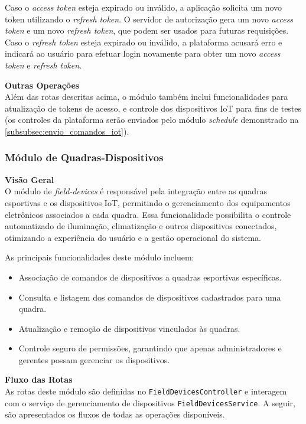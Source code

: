 Caso o \textit{access token} esteja expirado ou inválido, a aplicação solicita um novo token utilizando o \textit{refresh token}. O servidor de autorização gera um novo \textit{access token} e um novo \textit{refresh token}, que podem ser usados para futuras requisições. Caso o \textit{refresh token} esteja expirado ou inválido, a plataforma acusará erro e indicará ao usuário para efetuar login novamente para obter um novo \textit{access token} e \textit{refresh token}.
 
\textbf{Outras Operações}\\
Além das rotas descritas acima, o módulo também inclui funcionalidades para atualização de tokens de acesso, e controle dos dispositivos IoT para fins de testes (os controles da plataforma serão enviados pelo módulo \textit{schedule} demonstrado na \autoref{subsubsec:envio_comandos_iot}).

\subsubsection{Módulo de Quadras-Dispositivos}\label{subsubsec:modulo_quadras_dispositivos}

\textbf{Visão Geral}\\
O módulo de \textit{field-devices} é responsável pela integração entre as quadras esportivas e os dispositivos IoT, permitindo o gerenciamento dos equipamentos eletrônicos associados a cada quadra. Essa funcionalidade possibilita o controle automatizado de iluminação, climatização e outros dispositivos conectados, otimizando a experiência do usuário e a gestão operacional do sistema.

As principais funcionalidades deste módulo incluem:

\begin{itemize}
\item Associação de comandos de dispositivos a quadras esportivas específicas.
\item Consulta e listagem dos comandos de dispositivos cadastrados para uma quadra.
\item Atualização e remoção de dispositivos vinculados às quadras.
\item Controle seguro de permissões, garantindo que apenas administradores e gerentes possam gerenciar os dispositivos.
\end{itemize}

\textbf{Fluxo das Rotas}\\
As rotas deste módulo são definidas no \texttt{FieldDevicesController} e interagem com o serviço de gerenciamento de dispositivos \texttt{FieldDevicesService}. A seguir, são apresentados os fluxos de todas as operações disponíveis.

